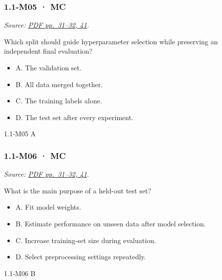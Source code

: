 \noindent\begin{minipage}{\linewidth}

\subsubsection{1.1-M05 · MC}\label{m05-mc}

\emph{Source:
\href{../Lecture\%20Slides/1.1.\%20Fundamentals.pdf\#page=31}{PDF
pp.~31--32, 41}.}

Which split should guide hyperparameter selection while preserving an
independent final evaluation?

\begin{itemize}
\tightlist
\item
  A. The validation set.
\item
  B. All data merged together.
\item
  C. The training labels alone.
\item
  D. The test set after every experiment.
\end{itemize}

\begin{solution}[8mm]{1.1-M05}
A
\end{solution}
\end{minipage}\par\medskip

\noindent\begin{minipage}{\linewidth}

\subsubsection{1.1-M06 · MC}\label{m06-mc}

\emph{Source:
\href{../Lecture\%20Slides/1.1.\%20Fundamentals.pdf\#page=31}{PDF
pp.~31--32, 41}.}

What is the main purpose of a held-out test set?

\begin{itemize}
\tightlist
\item
  A. Fit model weights.
\item
  B. Estimate performance on unseen data after model selection.
\item
  C. Increase training-set size during evaluation.
\item
  D. Select preprocessing settings repeatedly.
\end{itemize}

\begin{solution}[8mm]{1.1-M06}
B
\end{solution}
\end{minipage}\par\medskip


